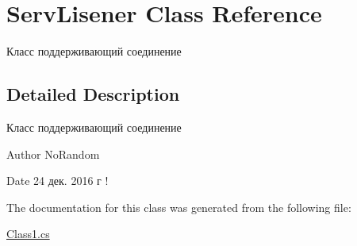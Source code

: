 \hypertarget{class_serv_lisener}{}\section{Serv\+Lisener Class Reference}
\label{class_serv_lisener}


Класс поддерживающий соединение  




\subsection{Detailed Description}
Класс поддерживающий соединение 

\begin{DoxyAuthor}{Author}
No\+Random 
\end{DoxyAuthor}
\begin{DoxyDate}{Date}
24 дек. 2016 г ! 
\end{DoxyDate}


The documentation for this class was generated from the following file\+:\begin{DoxyCompactItemize}
\item 
\hyperlink{_class1_8cs}{Class1.\+cs}\end{DoxyCompactItemize}
